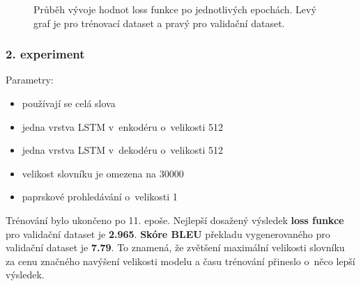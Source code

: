 \begin{figure}[H]
    \begin{center}
    \end{center}
	\caption{Průběh vývoje hodnot loss funkce po jednotlivých epochách. Levý graf je pro trénovací dataset a pravý pro validační dataset.}
\end{figure}

\subsubsection{2. experiment}\label{experiment2}
Parametry:
\begin{itemize}
  \item používají se celá slova
  \item jedna vrstva LSTM v~enkodéru o~velikosti 512
  \item jedna vrstva LSTM v~dekodéru o~velikosti 512
  \item velikost slovníku je omezena na 30000
  \item paprskové prohledávání o~velikosti 1
\end{itemize}

Trénování bylo ukončeno po 11. epoše. Nejlepší dosažený výsledek \textbf{loss funkce} pro validační dataset je \textbf{2.965}. \textbf{Skóre BLEU} překladu vygenerovaného pro validační dataset je \textbf{7.79}. To znamená, že zvětšení maximální velikosti slovníku za cenu značného navýšení velikosti modelu a času trénování přineslo o~něco lepší výsledek.

